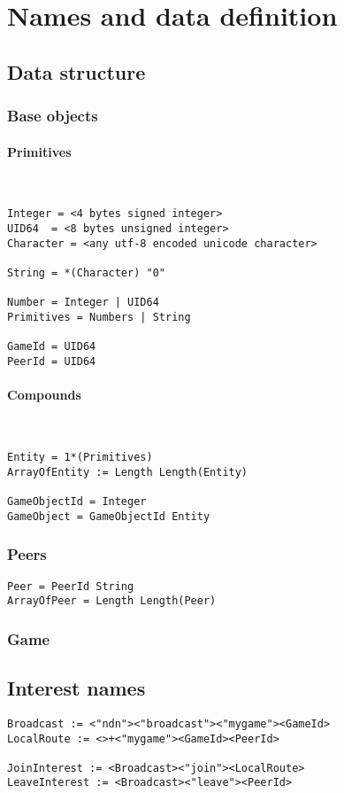 \section{Names and data definition}
\subsection{Data structure}

\subsubsection{Base objects}

\paragraph{Primitives}
~
\begin{lstlisting}
Integer = <4 bytes signed integer>
UID64  = <8 bytes unsigned integer>
Character = <any utf-8 encoded unicode character>

String = *(Character) "0"

Number = Integer | UID64
Primitives = Numbers | String

GameId = UID64
PeerId = UID64
\end{lstlisting}

\paragraph{Compounds}
~
\begin{lstlisting}
Entity = 1*(Primitives)
ArrayOfEntity := Length Length(Entity)

GameObjectId = Integer
GameObject = GameObjectId Entity
\end{lstlisting}

\subsubsection{Peers}

\begin{lstlisting}
Peer = PeerId String
ArrayOfPeer = Length Length(Peer)
\end{lstlisting}
\subsubsection{Game}

\subsection{Interest names}

\begin{lstlisting}
Broadcast := <"ndn"><"broadcast"><"mygame"><GameId>
LocalRoute := <>+<"mygame"><GameId><PeerId>

JoinInterest := <Broadcast><"join"><LocalRoute>
LeaveInterest := <Broadcast><"leave"><PeerId>
\end{lstlisting}
